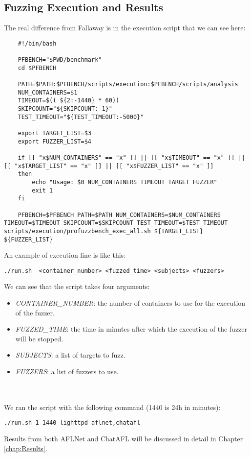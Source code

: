 \subsection{Fuzzing Execution and Results}

The real difference from Fallaway is in the execution script that we can see here:
\begin{lstlisting}
    #!/bin/bash

    PFBENCH="$PWD/benchmark"
    cd $PFBENCH

    PATH=$PATH:$PFBENCH/scripts/execution:$PFBENCH/scripts/analysis
    NUM_CONTAINERS=$1
    TIMEOUT=$(( ${2:-1440} * 60))
    SKIPCOUNT="${SKIPCOUNT:-1}"
    TEST_TIMEOUT="${TEST_TIMEOUT:-5000}"

    export TARGET_LIST=$3
    export FUZZER_LIST=$4

    if [[ "x$NUM_CONTAINERS" == "x" ]] || [[ "x$TIMEOUT" == "x" ]] || [[ "x$TARGET_LIST" == "x" ]] || [[ "x$FUZZER_LIST" == "x" ]]
    then
        echo "Usage: $0 NUM_CONTAINERS TIMEOUT TARGET FUZZER"
        exit 1
    fi

    PFBENCH=$PFBENCH PATH=$PATH NUM_CONTAINERS=$NUM_CONTAINERS TIMEOUT=$TIMEOUT SKIPCOUNT=$SKIPCOUNT TEST_TIMEOUT=$TEST_TIMEOUT scripts/execution/profuzzbench_exec_all.sh ${TARGET_LIST} ${FUZZER_LIST}
\end{lstlisting}
An example of execution line is like this:
\begin{lstlisting}
./run.sh  <container_number> <fuzzed_time> <subjects> <fuzzers>
\end{lstlisting}
We can see that the script takes four arguments:
\begin{itemize}
    \item \textit{CONTAINER\_NUMBER}: the number of containers to use for the execution of the fuzzer.
    \item \textit{FUZZED\_TIME}: the time in minutes after which the execution of the fuzzer will be stopped.
    \item \textit{SUBJECTS}: a list of targets to fuzz.
    \item \textit{FUZZERS}: a list of fuzzers to use.
\end{itemize}
\phantom{}\\\\
We ran the script with the following command (1440 is 24h in minutes):
\begin{lstlisting}
./run.sh 1 1440 lighttpd aflnet,chatafl
\end{lstlisting}
Results from both AFLNet and ChatAFL will be discussed in detail in Chapter \ref{chap:Results}.